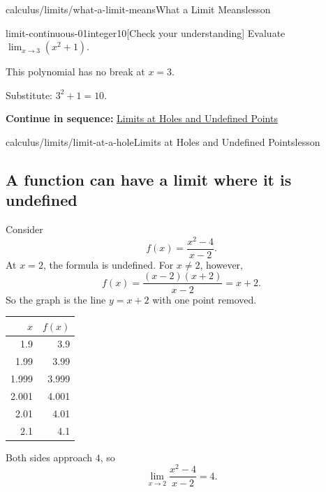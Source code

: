 \documentclass[11pt,openany]{book}
\theoremstyle{bgplain}
\newcounter{bgcheck}[section]
\newcommand{\webnext}[2]{%
  \par\addvspace{1.2em}\noindent{\color{BGLine}\rule{\textwidth}{0.35pt}}\par\smallskip
  {\small\color{BGGray}\textbf{Continue in sequence:} \hyperlink{web:#1}{#2}}\par
}
\begin{document}
\begin{webpage}{calculus/limits/what-a-limit-means}{What a Limit Means}{lesson}
\begin{bgcheck}{limit-continuous-01}{integer}{10}[Check your understanding]
Evaluate \(\lim_{x\to3}(x^2+1)\).
\begin{bghint}
This polynomial has no break at \(x=3\).
\end{bghint}
\begin{bgreveal}
Substitute: \(3^2+1=10\).
\end{bgreveal}
\end{bgcheck}


\webnext{calculus/limits/limit-at-a-hole}{Limits at Holes and Undefined Points}
\end{webpage}

\begin{webpage}{calculus/limits/limit-at-a-hole}{Limits at Holes and Undefined Points}{lesson}
\subsection{A function can have a limit where it is undefined}

Consider
\[
  f(x)=\frac{x^2-4}{x-2}.
\]
At \(x=2\), the formula is undefined. For \(x\ne2\), however,
\[
  f(x)=\frac{(x-2)(x+2)}{x-2}=x+2.
\]
So the graph is the line \(y=x+2\) with one point removed.

\begin{center}
\begin{tabular}{@{}r r@{}}
\toprule
\(x\) & \(f(x)\)\\
\midrule
1.9 & 3.9\\
1.99 & 3.99\\
1.999 & 3.999\\
2.001 & 4.001\\
2.01 & 4.01\\
2.1 & 4.1\\
\bottomrule
\end{tabular}
\end{center}

Both sides approach \(4\), so
\[
  \boxed{\lim_{x\to2}\frac{x^2-4}{x-2}=4}.
\]


\end{webpage}
\end{document}
